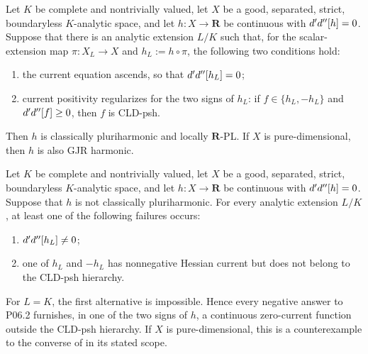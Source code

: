 
\begin{proposition}
\label{prop:p062-scalar-regularization-two-gate}
Let $K$ be complete and nontrivially valued, let $X$ be a good,
separated, strict, boundaryless $K$-analytic space, and let
$h\colon X\to\mathbf R$ be continuous with
$d'd''[h]=0$.  Suppose that there is an analytic extension
$L/K$ such that, for the scalar-extension map
$\pi\colon X_L\to X$ and $h_L:=h\circ\pi$, the following two conditions
hold:
\begin{enumerate}
\item the current equation ascends, so that
$d'd''[h_L]=0$;
\item current positivity regularizes for the two signs of $h_L$: if
$f\in\{h_L,-h_L\}$ and $d'd''[f]\geq0$, then $f$ is CLD-psh.
\end{enumerate}
Then $h$ is classically pluriharmonic and locally $\mathbf R$-PL.  If $X$
is pure-dimensional, then $h$ is also GJR harmonic.
\end{proposition}

\begin{corollary}
\label{cor:p062-counterexample-two-gate-obstruction}
Let $K$ be complete and nontrivially valued, let $X$ be a good, separated,
strict, boundaryless $K$-analytic space, and let
$h\colon X\to\mathbf R$ be continuous with $d'd''[h]=0$.
Suppose that $h$ is not classically pluriharmonic.  For every analytic
extension $L/K$, at least one of the following failures occurs:
\begin{enumerate}
\item $d'd''[h_L]\neq0$;
\item one of $h_L$ and $-h_L$ has nonnegative Hessian current but does
not belong to the CLD-psh hierarchy.
\end{enumerate}
For $L=K$, the first alternative is impossible.  Hence every negative
answer to P06.2 furnishes, in one of the two signs of $h$, a continuous
zero-current function outside the CLD-psh hierarchy.  If $X$ is
pure-dimensional, this is a counterexample to the converse of
 in its stated scope.
\end{corollary}
